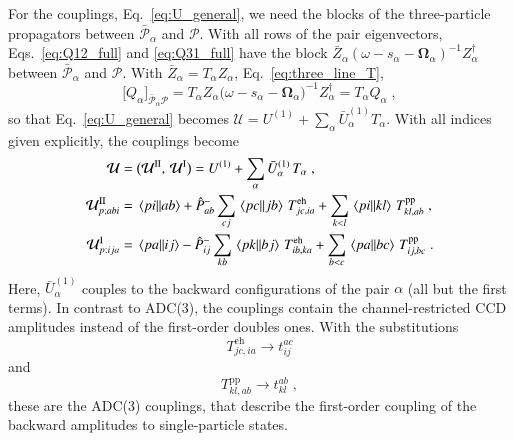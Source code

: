 \documentclass[aip,jcp,reprint,noshowkeys,superscriptaddress]{revtex4-1}
\newcommand{\eh}{\text{eh}}
\newcommand{\pp}{\text{pp}}
\begin{document}
For the couplings, Eq.~\eqref{eq:U_general}, we need the blocks of the
three-particle propagators between $\bar{\mathcal P}_\alpha$ and
$\mathcal P$. With all rows of the pair eigenvectors,
Eqs.~\eqref{eq:Q12_full} and \eqref{eq:Q31_full} have the block
$\bar Z_\alpha(\omega-s_\alpha-\boldsymbol\Omega_\alpha)^{-1}Z_\alpha^\dagger$
between $\bar{\mathcal P}_\alpha$ and $\mathcal P$. With
$\bar Z_\alpha=T_\alpha Z_\alpha$, Eq.~\eqref{eq:three_line_T},
\begin{equation}
\big[Q_\alpha\big]_{\bar{\mathcal P}_\alpha\mathcal P}
=
T_\alpha Z_\alpha\big(\omega-s_\alpha-\boldsymbol\Omega_\alpha\big)^{-1}Z_\alpha^\dagger
=
T_\alpha Q_\alpha \;,
\nonumber
\end{equation}
so that Eq.~\eqref{eq:U_general} becomes
$\mathcal U=U^{(1)}+\sum_\alpha\bar U^{(1)}_\alpha T_\alpha$. With all indices 
given explicitly, the couplings become
\begin{align}
\mathcal U
={}&
\big(\mathcal U^{\rm II},\,\mathcal U^{\rm I}\big)
=
U^{(1)}+\sum_\alpha \bar U^{(1)}_{\alpha}\,T_\alpha \;,
\nonumber\\
\mathcal U^{\rm II}_{p;abi}
={}&
\mel{pi}{}{ab}
+ \hat P^-_{ab}\sum_{cj}\mel{pc}{}{jb}\,T^{\eh}_{jc,ia}
+\sum_{k<l}\mel{pi}{}{kl}\,T^{\pp}_{kl,ab} \;,
\nonumber\\
\mathcal U^{\rm I}_{p;ija}
={}&
\mel{pa}{}{ij}
-\hat P^-_{ij}\sum_{kb}\mel{pk}{}{bj}\,T^{\eh}_{ib,ka}
+\sum_{b<c}\mel{pa}{}{bc}\,T^{\pp}_{ij,bc} \;.
\label{eq:Ueff_depth1}
\end{align}
Here, $\bar U^{(1)}_{\alpha}$ couples to the backward configurations of the
pair $\alpha$ (all but the first terms). 
In contrast to ADC(3), the couplings
contain the channel-restricted CCD amplitudes instead of the
first-order doubles ones. With the substitutions
\begin{equation}
	T^{\eh}_{jc,ia} \rightarrow t^{ac}_{ij}
\end{equation}
and 
\begin{equation}
	T^{\pp}_{kl,ab} \rightarrow t^{ab}_{kl} \;,
\end{equation}
these are the ADC(3) couplings, that describe the first-order coupling 
of the backward amplitudes to single-particle states.
\end{document}
